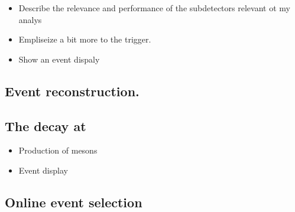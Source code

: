 

\begin{itemize}
  \item Describe the relevance and performance of the subdetectors relevant ot my analys
  \item Empliseize a bit more to the trigger.
  \item Show an event dispaly
\end{itemize}


\subsection{Event reconstruction.}
\label{reconstruction}

\subsection{The \BsJpsiKst decay at \lhcb}
\label{BspsiKst_at_lhcb}

\begin{itemize}
  \item Production of \Bs mesons
  \item Event display
\end{itemize}

\subsection{Online event selection}
